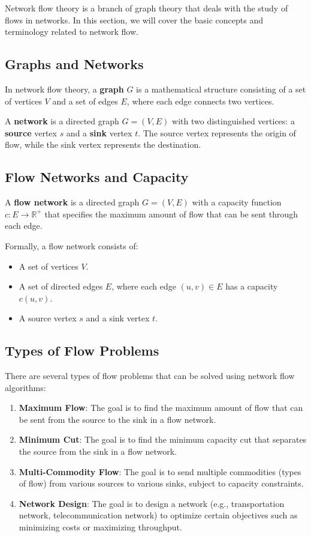 \documentclass[12pt]{book} %
\begin{document}
Network flow theory is a branch of graph theory that deals with the study of flows in networks. In this section, we will cover the basic concepts and terminology related to network flow.

\subsection{Graphs and Networks}

In network flow theory, a \textbf{graph} \(G\) is a mathematical structure consisting of a set of vertices \(V\) and a set of edges \(E\), where each edge connects two vertices. 

A \textbf{network} is a directed graph \(G = (V, E)\) with two distinguished vertices: a \textbf{source} vertex \(s\) and a \textbf{sink} vertex \(t\). The source vertex represents the origin of flow, while the sink vertex represents the destination.

\subsection{Flow Networks and Capacity}

A \textbf{flow network} is a directed graph \(G = (V, E)\) with a capacity function \(c : E \rightarrow \mathbb{R}^+\) that specifies the maximum amount of flow that can be sent through each edge.

Formally, a flow network consists of:
\begin{itemize}
    \item A set of vertices \(V\).
    \item A set of directed edges \(E\), where each edge \((u, v) \in E\) has a capacity \(c(u, v)\).
    \item A source vertex \(s\) and a sink vertex \(t\).
\end{itemize}

\subsection{Types of Flow Problems}

There are several types of flow problems that can be solved using network flow algorithms:

\begin{enumerate}
    \item \textbf{Maximum Flow}: The goal is to find the maximum amount of flow that can be sent from the source to the sink in a flow network.
    \item \textbf{Minimum Cut}: The goal is to find the minimum capacity cut that separates the source from the sink in a flow network.
    \item \textbf{Multi-Commodity Flow}: The goal is to send multiple commodities (types of flow) from various sources to various sinks, subject to capacity constraints.
    \item \textbf{Network Design}: The goal is to design a network (e.g., transportation network, telecommunication network) to optimize certain objectives such as minimizing costs or maximizing throughput.
\end{enumerate}
\end{document}

